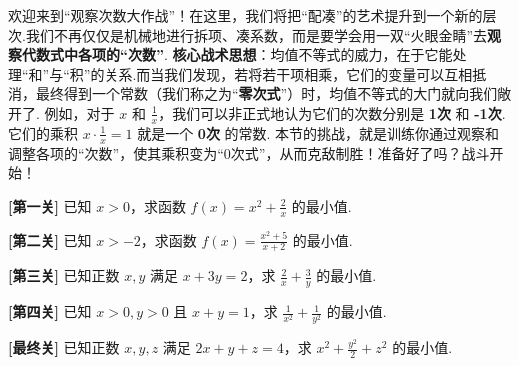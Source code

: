 	欢迎来到“观察次数大作战”！在这里，我们将把“配凑”的艺术提升到一个新的层次.我们不再仅仅是机械地进行拆项、凑系数，而是要学会用一双“火眼金睛”去\textbf{观察代数式中各项的“次数”}.
	\textbf{核心战术思想}：均值不等式的威力，在于它能处理“和”与“积”的关系.而当我们发现，若将若干项相乘，它们的变量可以互相抵消，最终得到一个常数（我们称之为“\textbf{零次式}”）时，均值不等式的大门就向我们敞开了.
	例如，对于 $x$ 和 $\frac{1}{x}$，我们可以非正式地认为它们的次数分别是 \textbf{1次} 和 \textbf{-1次}.它们的乘积 $x \cdot \frac{1}{x} = 1$ 就是一个 \textbf{0次} 的常数.
	本节的挑战，就是训练你通过观察和调整各项的“次数”，使其乘积变为“0次式”，从而克敌制胜！准备好了吗？战斗开始！

\newcommand{\degree}[2]{%
	\tikz[baseline=(M.base)] {
		\node[inner sep=0pt] (M) {$#2$}; 
		\node[draw, circle, red, inner sep=1pt, font=\tiny, above=1.5pt] at (M.north) {$#1$}; 
	}%
}

\begin{problemset}
	
	\item \textbf{[第一关]} 已知 $x>0$，求函数 $f(x) = x^2 + \frac{2}{x}$ 的最小值.
	
	\item \textbf{[第二关]} 已知 $x>-2$，求函数 $f(x) = \frac{x^2+5}{x+2}$ 的最小值.
	
	\item \textbf{[第三关]} 已知正数 $x,y$ 满足 $x+3y=2$，求 $\frac{2}{x}+\frac{3}{y}$ 的最小值.
	
	\item \textbf{[第四关]} 已知 $x>0, y>0$ 且 $x+y=1$，求 $\frac{1}{x^2}+\frac{1}{y^2}$ 的最小值.
	
	\item \textbf{[最终关]} 已知正数 $x,y,z$ 满足 $2x+y+z=4$，求 $x^2+\frac{y^2}{2}+z^2$ 的最小值.
	
\end{problemset}

\newpage

\begin{note}
\end{note}


